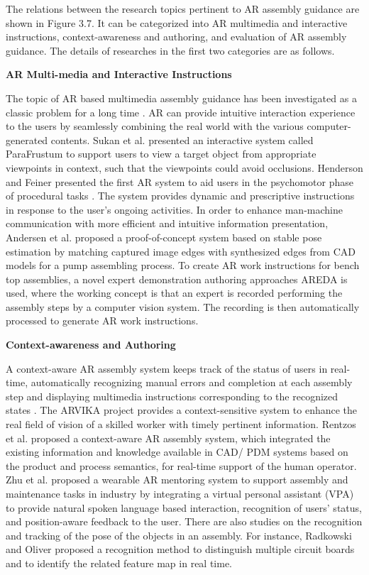 \documentclass[fyp]{socreport}
\begin{document}
The relations between the research topics pertinent to AR assembly guidance are shown in Figure 3.7. It can be categorized into AR multimedia and interactive instructions, context-awareness and authoring, and evaluation of AR assembly guidance. The details of researches in the first two categories are as follows.

\textbf{AR Multi-media and Interactive Instructions}

The topic of AR based multimedia assembly guidance has been investigated as a classic problem for a long time \cite{wang2016comprehensive}. AR can provide intuitive interaction experience to the users by seamlessly combining the real world with the various computer-generated contents. Sukan et al. \cite{sukan2014parafrustum} presented an interactive system called ParaFrustum to support users to view a target object from appropriate viewpoints in context, such that the viewpoints could avoid occlusions.  Henderson and Feiner \cite{henderson2011augmented} presented the first AR system to aid users in the psychomotor phase of procedural tasks \cite{neumann1998cognitive}. The system provides dynamic and prescriptive instructions in response to the user’s ongoing activities. In order to enhance man-machine communication with more efficient and intuitive information presentation, Andersen et al. \cite{andersen2009interactive} proposed a proof-of-concept system based on stable pose estimation by matching captured image edges with synthesized edges from CAD models for a pump assembling process. To create AR work instructions for bench top assemblies, a novel expert demonstration authoring approaches AREDA \cite{bhattacharya2019augmented} is used, where the working concept is that an expert is recorded performing the assembly steps by a computer vision system. The recording is then automatically processed to generate AR work instructions. 

\textbf{Context-awareness and Authoring}

A context-aware AR assembly system keeps track of the status of users in real-time, automatically recognizing manual errors and completion at each assembly step and displaying multimedia instructions corresponding to the recognized states \cite{khuong2014effectiveness}. The ARVIKA project \cite{friedrich2002arvika} provides a context-sensitive system to enhance the real field of vision of a skilled worker with timely pertinent information. Rentzos et al. \cite{rentzos2013augmented} proposed a context-aware AR assembly system, which integrated the existing information and knowledge available in CAD/ PDM systems based on the product and process semantics, for real-time support of the human operator. Zhu et al. \cite{zhu2014ar} proposed a wearable AR mentoring system to support assembly and maintenance tasks in industry by integrating a virtual personal assistant (VPA) to provide natural spoken language based interaction, recognition of users’ status, and position-aware feedback to the user. There are also studies on the recognition and tracking of the pose of the objects in an assembly. For instance, Radkowski and Oliver \cite{radkowski2013natural} proposed a recognition method to distinguish multiple circuit boards and to identify the related feature map in real time. 
\end{document}
